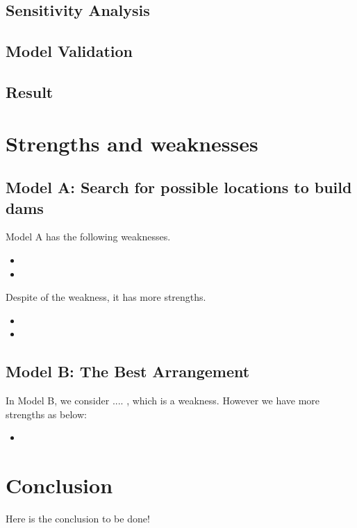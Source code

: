\documentclass{mcmthesis}
\begin{document}

\subsection{Sensitivity Analysis}

\subsection{Model Validation}

\subsection{Result}

\section{Strengths and weaknesses}
\subsection{Model A: Search for possible locations to build dams}
Model A has the following weaknesses.
\begin{itemize}
\item 
\item 
\end{itemize}
Despite of the weakness, it has more strengths.
\begin{itemize}
  \item 
  \item 
\end{itemize}

\subsection{Model B: The Best Arrangement}
In Model B, we consider .... , which is a weakness. However we have more strengths as below:
\begin{itemize}
  \item 
\end{itemize}

\section{Conclusion}
\indent \indent Here is the conclusion to be done!
\end{document}

